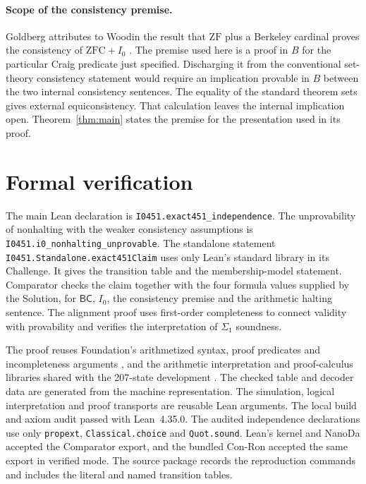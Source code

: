 \documentclass[11pt,letterpaper]{article}
\theoremstyle{definition}
\newcommand{\ZF}{\mathrm{ZF}}
\newcommand{\ZFC}{\mathrm{ZFC}}
\newcommand{\cardB}{\mathsf{BC}}
\newcommand{\file}[1]{\texttt{\nolinkurl{#1}}}
\begin{document}
\paragraph{Scope of the consistency premise.}
Goldberg attributes to Woodin the result that $\ZF$ plus a
Berkeley cardinal proves the consistency of $\ZFC+I_0$
\cite[slide~15]{goldberg}. The premise used here is a proof in
$B$ for the particular Craig predicate just specified.
Discharging it from the conventional set-theory consistency
statement would require an implication provable in $B$ between
the two internal consistency sentences. The equality of the
standard theorem sets gives external equiconsistency. That
calculation leaves the internal implication open. Theorem~\ref{thm:main}
states the premise for the presentation used in its proof.

\section{Formal verification}\label{sec:verification}

The main Lean declaration is \file{I0451.exact451_independence}.
The unprovability of nonhalting with the weaker consistency
assumptions is \file{I0451.i0_nonhalting_unprovable}.
The standalone statement \file{I0451.Standalone.exact451Claim}
uses only Lean's standard library in its Challenge.
It gives the transition table and the membership-model statement.
Comparator checks the claim together with the four formula values
supplied by the Solution, for $\cardB$, $I_0$, the consistency
premise and the arithmetic halting sentence. The alignment proof
uses first-order completeness to connect validity with provability
and verifies the interpretation of $\Sigma_1$ soundness.

The proof reuses Foundation's arithmetized syntax, proof predicates
and incompleteness arguments \cite{foundation}, and the arithmetic
interpretation and proof-calculus libraries shared with the
207-state development \cite{zf207}. The checked table and decoder
data are generated from the machine representation. The simulation,
logical interpretation and proof transports are reusable Lean
arguments. The local build and axiom audit passed with Lean~4.35.0.
The audited independence declarations use only \file{propext},
\file{Classical.choice} and \file{Quot.sound}. Lean's kernel and
NanoDa accepted the Comparator export, and the bundled Con-Ron
accepted the same export in verified mode. The source package
records the reproduction commands and includes the literal and named
transition tables.
\end{document}
